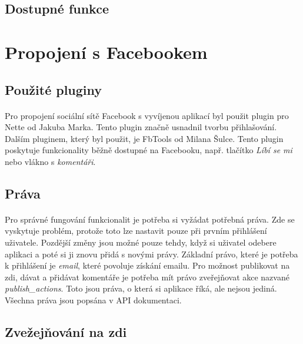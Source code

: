 \documentclass[11pt,a4paper,titlepage,oneside]{book}
\begin{document}
					\paragraph{} 
			\subsection{Dostupné funkce}
				\paragraph{}

		\section{Propojení s Facebookem}
			\subsection{Použité pluginy}
				\paragraph{} Pro propojení sociální sítě Facebook s vyvíjenou aplikací byl použit plugin pro Nette\cite{nette20login} od Jakuba Marka. Tento plugin značně usnadnil tvorbu přihlašování. Dalším pluginem, který byl použit, je FbTools\cite{FbTools} od Milana Šulce. Tento plugin poskytuje funkcionality běžně dostupné na Facebooku, např. tlačítko \textit{Líbí se mi} nebo vlákno s \textit{komentáři}.
			\subsection{Práva}
				\paragraph{} Pro správné fungování funkcionalit je potřeba si vyžádat potřebná  práva. Zde se vyskytuje problém, protože toto lze nastavit pouze při prvním přihlášení uživatele. Pozdější změny jsou možné pouze tehdy, když si uživatel odebere aplikaci a poté si ji znovu přidá s novými právy. Základní právo, které je potřeba k přihlášení je \textit{email}, které povoluje získání emailu. Pro možnost publikovat na zdi, dávat  a přidávat komentáře je potřeba mít právo zveřejňovat akce nazvané \textit{publish\_actions}. Toto jsou práva, o která si aplikace říká, ale nejsou jediná. Všechna práva jsou popsána v API dokumentaci\cite{FbApiPrava}.
			\subsection{Zvežejňování na zdi}
\end{document}
